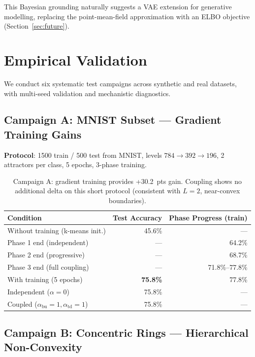 \documentclass[11pt,a4paper]{article}
\begin{document}
This Bayesian grounding naturally suggests a VAE extension for generative modelling, replacing
the point-mean-field approximation with an ELBO objective (Section~\ref{sec:future}).

\section{Empirical Validation}

We conduct six systematic test campaigns across synthetic and real datasets, with multi-seed
validation and mechanistic diagnostics.

\subsection{Campaign A: MNIST Subset --- Gradient Training Gains}

\textbf{Protocol}: 1500 train / 500 test from MNIST, levels $784 \to 392 \to 196$, 2 attractors
per class, 5 epochs, 3-phase training.

\begin{table}[h]
\centering
\begin{tabular}{lrr}
\toprule
\textbf{Condition} & \textbf{Test Accuracy} & \textbf{Phase Progress (train)} \\
\midrule
Without training (k-means init.) & 45.6\% & --- \\
Phase 1 end (independent) & --- & 64.2\% \\
Phase 2 end (progressive) & --- & 68.7\% \\
Phase 3 end (full coupling) & --- & 71.8\%--77.8\% \\
With training (5 epochs) & \textbf{75.8\%} & 77.8\% \\
Independent ($\alpha=0$) & 75.8\% & --- \\
Coupled ($\alpha_{\mathrm{bu}}=1, \alpha_{\mathrm{td}}=1$) & 75.8\% & --- \\
\bottomrule
\end{tabular}
\caption{Campaign A: gradient training provides +30.2~pts gain.  Coupling shows no additional
delta on this short protocol (consistent with $L=2$, near-convex boundaries).}
\label{tab:campaign_a}
\end{table}

\subsection{Campaign B: Concentric Rings --- Hierarchical Non-Convexity}
\end{document}
